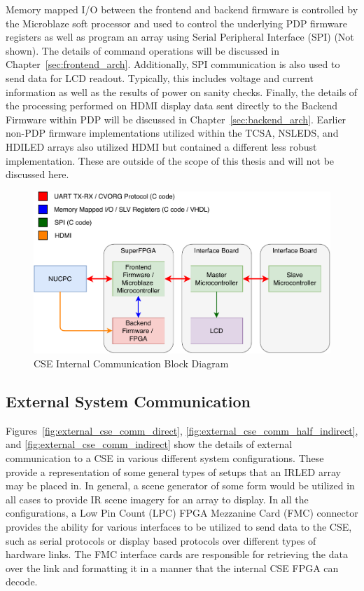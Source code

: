        Memory mapped I/O between the frontend and backend firmware is controlled by the Microblaze soft processor and used to control the underlying PDP firmware registers as well as program an array using Serial Peripheral Interface (SPI) (Not shown). The details of command operations will be discussed in Chapter~\ref{sec:frontend_arch}. Additionally, SPI communication is also used to send data for LCD readout. Typically, this includes voltage and current information as well as the results of power on sanity checks. Finally, the details of the processing performed on HDMI display data sent directly to the Backend Firmware within PDP will be discussed in Chapter~\ref{sec:backend_arch}. Earlier non-PDP firmware implementations utilized within the TCSA, NSLEDS, and HDILED arrays also utilized HDMI but contained a different less robust implementation. These are outside of the scope of this thesis and will not be discussed here.

        \begin{figure}
            \centering
            \includegraphics[width=1.0\textwidth]{fig/cse_comm_block.pdf}
            \caption{CSE Internal Communication Block Diagram}
            \label{fig:cse_comm_block}
        \end{figure}

    \subsection{External System Communication}
        Figures~\ref{fig:external_cse_comm_direct}, \ref{fig:external_cse_comm_half_indirect}, and \ref{fig:external_cse_comm_indirect} show the details of external communication to a CSE in various different system configurations. These provide a representation of some general types of setups that an IRLED array may be placed in. In general, a scene generator of some form would be utilized in all cases to provide IR scene imagery for an array to display. In all the configurations, a Low Pin Count (LPC) FPGA Mezzanine Card (FMC) connector provides the ability for various interfaces to be utilized to send data to the CSE, such as serial protocols or display based protocols over different types of hardware links. The FMC interface cards are responsible for retrieving the data over the link and formatting it in a manner that the internal CSE FPGA can decode.

